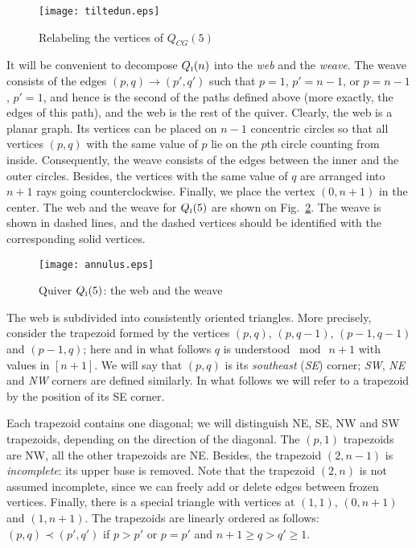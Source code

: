 \documentclass{amsart}
\theoremstyle{definition}
\theoremstyle{remark}
\numberwithin{equation}{section}
\numberwithin{theorem}{section}
\begin{document}
\begin{figure}[ht]
\begin{center}
\texttt{[image: tiltedun.eps]}
\caption{Relabeling the vertices of $Q_{CG}(5)$}
\label{fig:tilt}
\end{center}
\end{figure}

It will be convenient to decompose $Q_{\mbox{\tiny\rm I}}(n)$ into the {\it web\/} and the {\it weave\/}. 
The weave consists of the edges $(p,q)\to (p',q')$ such that $p=1$, $p'=n-1$, or $p=n-1$, $p'=1$, and 
hence is the second of the paths defined above (more exactly, the edges of this path), and the web is 
the rest of the quiver. Clearly, the web is a planar graph. Its vertices can be placed on $n-1$ 
concentric circles so that
all vertices $(p,q)$ with the same value of $p$ lie on the $p$th circle counting from inside. 
Consequently, the weave consists of the edges between the inner and the outer circles. Besides, the vertices with the same value of $q$ are arranged into $n+1$ rays going counterclockwise. Finally, 
we place the vertex $(0, n+1)$ in the center. The web and the weave for $Q_{\mbox{\tiny\rm I}}(5)$ are shown on
 Fig.~\ref{fig:ann}. The weave is shown in dashed lines, and the dashed vertices should be identified 
 with the corresponding solid vertices.

 \begin{figure}[ht]
\begin{center}
\texttt{[image: annulus.eps]}
\caption{Quiver $Q_{\mbox{\tiny\rm I}}(5)$: the web and the weave}
\label{fig:ann}
\end{center}
\end{figure}

  The web is subdivided into consistently oriented triangles. More precisely, consider the trapezoid formed
by the vertices $(p,q)$, $(p,q-1)$, $(p-1,q-1)$ and $(p-1,q)$; here and in what follows 
$q$ is understood $\bmod\ n+1$ with values in $[n+1]$. We will 
say that $(p,q)$ is its {\it southeast\/} ({\it SE\/}) corner; {\it SW\/}, {\it NE\/} and {\it NW\/} corners are defined similarly. In what follows we will refer to a trapezoid by the position of its SE corner.
   
Each trapezoid contains one diagonal; we will distinguish NE, SE, NW and SW trapezoids, depending on the direction of the diagonal. The $(p,1)$ trapezoids  are NW, all the other trapezoids
are NE. Besides, the trapezoid $(2,n-1)$ is {\it incomplete\/}: its upper base is removed. Note that 
the trapezoid $(2,n)$ is not assumed incomplete, since we can freely add or delete edges between 
frozen vertices. Finally, there is a special triangle with vertices at $(1,1)$, $(0,n+1)$ and $(1,n+1)$.
The trapezoids are linearly ordered as follows: $(p,q)\prec (p',q')$ if $p>p'$ or $p=p'$ and $n+1\geq q>q'\geq 1$.
\end{document}
